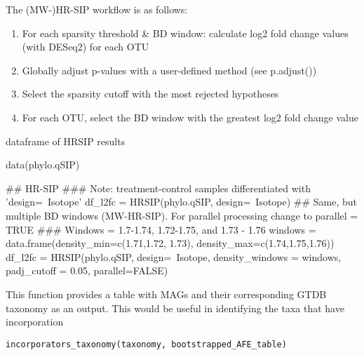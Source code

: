 \documentclass[a4paper]{book}
\begin{document}
%
\begin{Details}\relax
The (MW-)HR-SIP workflow is as follows:

\begin{enumerate}

\item{} For each sparsity threshold \& BD window: calculate log2 fold change values (with DESeq2) for each OTU
\item{} Globally adjust p-values with a user-defined method (see p.adjust())
\item{} Select the sparsity cutoff with the most rejected hypotheses
\item{} For each OTU, select the BD window with the greatest log2 fold change value

\end{enumerate}

\end{Details}
%
\begin{Value}
dataframe of HRSIP results
\end{Value}
%
\begin{Examples}
\begin{ExampleCode}
data(phylo.qSIP)


## HR-SIP
### Note: treatment-control samples differentiated with 'design=~Isotope'
df_l2fc = HRSIP(phylo.qSIP, design=~Isotope)
## Same, but multiple BD windows (MW-HR-SIP). For parallel processing change to parallel = TRUE
### Windows = 1.7-1.74, 1.72-1.75, and 1.73 - 1.76
windows = data.frame(density_min=c(1.71,1.72, 1.73), density_max=c(1.74,1.75,1.76))
df_l2fc = HRSIP(phylo.qSIP,
                design=~Isotope,
                density_windows = windows,
                padj_cutoff = 0.05,
                parallel=FALSE)



\end{ExampleCode}
\end{Examples}
%
\begin{Description}\relax
This function provides a table with MAGs and their corresponding GTDB taxonomy
as an output. This would be useful in identifying the taxa that have incorporation
\end{Description}
%
\begin{Usage}
\begin{verbatim}
incorporators_taxonomy(taxonomy, bootstrapped_AFE_table)
\end{verbatim}
\end{Usage}
\end{document}
